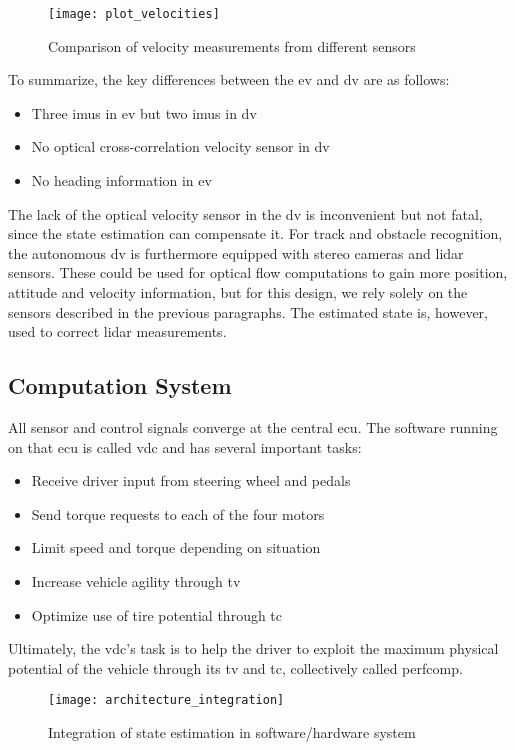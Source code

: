 \begin{figure}
	\centering
	\texttt{[image: plot\_velocities]}%
	\caption{Comparison of velocity measurements from different sensors}
	\label{fig:velocities}
\end{figure}

To summarize, the key differences between the \gls{ev} and \gls{dv} are as follows:
\begin{itemize}
\item Three \glspl{imu} in \gls{ev} but two \glspl{imu} in \gls{dv}
\item No optical cross-correlation velocity sensor in \gls{dv}
\item No heading information in \gls{ev}
\end{itemize}
The lack of the optical velocity sensor in the \gls{dv} is inconvenient but not fatal, since the state estimation can compensate it. For track and obstacle recognition, the autonomous \gls{dv} is furthermore equipped with stereo cameras and lidar sensors. These could be used for optical flow computations to gain more position, attitude and velocity information, but for this design, we rely solely on the sensors described in the previous paragraphs. The estimated state is, however, used to correct lidar measurements.


\subsection{Computation System}\label{sec:design-computation-system}
All sensor and control signals converge at the central \gls{ecu}. The software running on that \gls{ecu} is called \gls{vdc} and has several important tasks:
\begin{itemize}
\item Receive driver input from steering wheel and pedals
\item Send torque requests to each of the four motors
\item Limit speed and torque depending on situation
\item Increase vehicle agility through \gls{tv}
\item Optimize use of tire potential through \gls{tc}
\end{itemize}
Ultimately, the \gls{vdc}'s task is to help the driver to exploit the maximum physical potential of the vehicle through its \gls{tv} and \gls{tc}, collectively called \gls{perfcomp}.

\begin{figure}
	\centering
	\texttt{[image: architecture\_integration]}%
	\caption{Integration of state estimation in software/hardware system}
	\label{fig:architecture-integration}
\end{figure}

